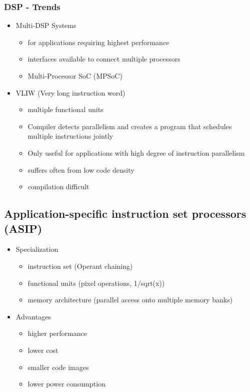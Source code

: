 \subsubsection{DSP - Trends}
\begin{itemize}
	\item Multi-DSP Systems
	\begin{itemize}
		\item for applications requiring highest performance
		\item interfaces available to connect multiple processors
		\item Multi-Processor SoC (MPSoC)
	\end{itemize}
	\item VLIW (Very long instruction word)
	\begin{itemize}
		\item multiple functional units
		\item Compiler detects parallelism and creates a program that schedules multiple instructions jointly
		\item Only useful for applications with high degree of instruction parallelism
		\item suffers often from low code density
		\item compilation difficult
	\end{itemize}
\end{itemize}

\subsection{Application-specific instruction set processors (ASIP)}
\begin{itemize}
	\item Specialization
	\begin{itemize}
		\item instruction set (Operant chaining)
		\item functional units (pixel operations, 1/sqrt(x))
		\item memory architecture (parallel access onto multiple memory banks)
	\end{itemize}
	\item Advantages
	\begin{itemize}
		\item higher performance
		\item lower cost
		\item smaller code images
		\item lower power consumption 
	\end{itemize}


\end{itemize}





















